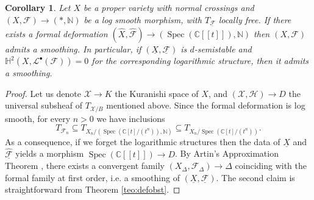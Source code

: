 \documentclass[reqno]{amsart}
\newcommand\C{\mathbb{C}}
\newcommand\N{\mathbb{N}}
\renewcommand\H{\mathbb{H}}
\DeclareMathOperator{\Spec}{Spec}
\newcommand{\X}{\mathcal{X}}
\newcommand{\F}{\mathscr{F}}
\renewcommand{\H}{\mathbb{H}}
\newcounter{Theorem}
\newtheorem{corollary}[theorem]{Corollary}
\theoremstyle{definition}
\theoremstyle{named}
\begin{document}
\begin{corollary}\label{cor:smoothing}
Let $X$ be a proper variety with normal crossings and $(X,\F)\to (\ast,\N)$ be a log smooth morphism, with $T_{\underline{\F}}$ locally free. If there exists a formal deformation $(\widehat{X},\widehat{\F})\to (\Spec(\C[[t]]),\N)$ then $(X,\F)$  admits a smoothing. In particular, if $(\underline{X},\underline{\F})$ is $d$-semistable and $\H^2(X,\mathcal L^\bullet(\F))=0$ for the corresponding logarithmic structure, then it admits a smoothing. 
\end{corollary}
\begin{proof}
Let us denote $\X\to K$ the Kuranishi space of $X$, and $(\X,\mathcal H)\to D$ the universal subsheaf of $T_{\X/B}$ mentioned above. 
Since the formal deformation is log smooth, for every $n>0$ we have inclusions 
$$ T_{\F_n} \subseteq T_{X_n/(\Spec(\C[t]/(t^n)),\N)}\subseteq T_{X_n/\Spec(\C[t]/(t^n))}.$$
As a consequence, if we forget the logarithmic structures then the data of $\widehat{\underline{X}}$ and $\widehat{\underline{\F}}$ yields a morphism  $\Spec(\C[[t]])\to D$. By Artin's Approximation Theorem \cite[Theorem 1.2]{artin1968solutions}, there exists a convergent family $(X_\Delta,\F_\Delta)\to \Delta$ coinciding with the formal family at first order, i.e. a smoothing of $(\underline{X},\underline{\F})$. 
The second claim is straightforward from Theorem \ref{teo:defobst}.
\end{proof}
\end{document}
